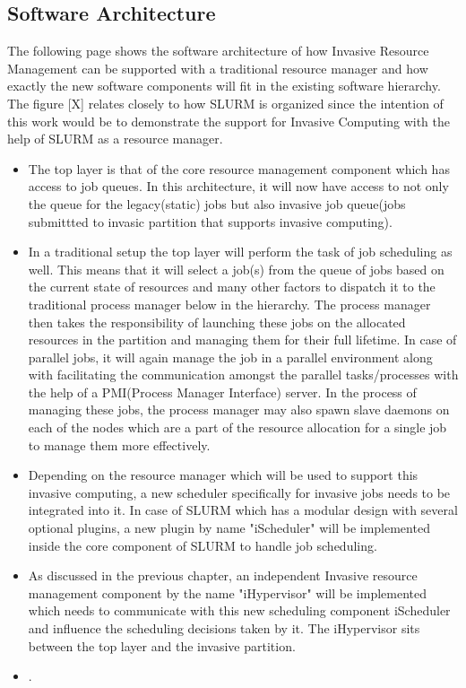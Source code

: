 \documentclass[a4paper, 12pt]{article}
\begin{document}
\subsection{Software Architecture}
The following page shows the software architecture of how Invasive Resource Management can be supported with a traditional resource manager and how exactly the new software components will fit in the existing software hierarchy. The figure [X] relates closely to how SLURM is organized since the intention of this work would be to demonstrate the support for Invasive Computing with the help of SLURM as a resource manager.
\begin{itemize}
\item The top layer is that of the core resource management component which has access to job queues. In this architecture, it will now have access to not only the queue for the legacy(static) jobs but also invasive job queue(jobs submittted to invasic partition that supports invasive computing).
\item In a traditional setup the top layer will perform the task of job scheduling as well. This means that it will select a job(s) from the queue of jobs based on the current state of resources and many other factors to dispatch it to the traditional process manager below in the hierarchy. The process manager then takes the responsibility of launching these jobs on the allocated resources in the partition and managing them for their full lifetime. In case of parallel jobs, it will again manage the job in a parallel environment along with facilitating the communication amongst the parallel tasks/processes with the help of a PMI(Process Manager Interface) server. In the process of managing these jobs, the process manager may also spawn slave daemons on each of the nodes which are a part of the resource allocation for a single job to manage them more effectively.
\item Depending on the resource manager which will be used to support this invasive computing, a new scheduler specifically for invasive jobs needs to be integrated into it. In case of SLURM which has a modular design with several optional plugins, a new plugin by name "iScheduler" will be implemented inside the core component of SLURM to handle job scheduling.
\item As discussed in the previous chapter, an independent Invasive resource management component by the name "iHypervisor" will be implemented which needs to communicate with this new scheduling component iScheduler and influence the scheduling decisions taken by it. The iHypervisor sits between the top layer and the invasive partition.
\item .
\end{itemize}
\end{document}
